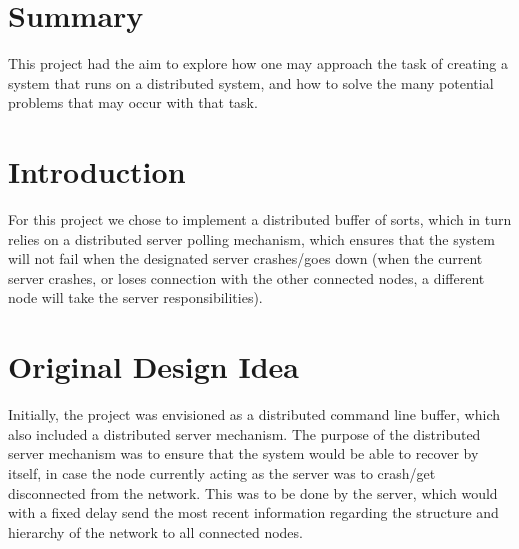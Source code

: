 \documentclass[12pt]{article}
\begin{document}
\section{Summary} %
\label{sec:summary}
This project had the aim to explore how one may approach the task of creating a system that runs on a distributed system, and how to solve the many potential problems that may occur with that task.

\section{Introduction} %
\label{sec:introduction}
For this project we chose to implement a distributed buffer of sorts, which in turn relies on a distributed server polling mechanism, which ensures that the system will not fail when the designated server crashes/goes down (when the current server crashes, or loses connection with the other connected nodes, a different node will take the server responsibilities).

\section{Original Design Idea} %
\label{sec:original_design_idea}
Initially, the project was envisioned as a distributed command line buffer, which also included a distributed server mechanism. The purpose of the distributed server mechanism was to ensure that the system would be able to recover by itself, in case the node currently acting as the server was to crash/get disconnected from the network. This was to be done by the server, which would with a fixed delay send the most recent information regarding the structure and hierarchy of the network to all connected nodes.
\end{document}
